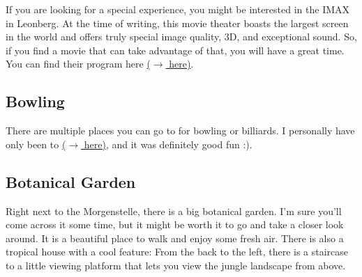 If you are looking for a special experience, you might be interested in the IMAX in Leonberg. At the time of writing, this movie theater boasts the largest screen in the world and offers truly special image quality, 3D, and exceptional sound. So, if you find a movie that can take advantage of that, you will have a great time. You can find their program here \href{https://imax.traumpalast.de/index.php/PID/11295.html}{($\xrightarrow{}$ here)}.

\subsection{Bowling}
There are multiple places you can go to for bowling or billiards. I personally have only been to  \href{https://maps.app.goo.gl/dgMVABnYTJC7qGBT8}{($\xrightarrow{}$ here)}, and it was definitely good fun :).

\subsection{Botanical Garden}
Right next to the Morgenstelle, there is a big botanical garden. I'm sure you'll come across it some time, but it might be worth it to go and take a closer look around. It is a beautiful place to walk and enjoy some fresh air. There is also a tropical house with a cool feature: From the back to the left, there is a staircase to a little viewing platform that lets you view the jungle landscape from above.